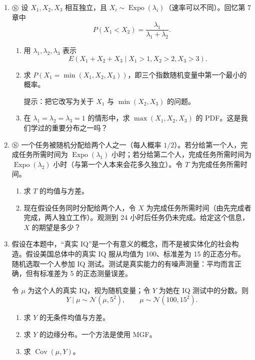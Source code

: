 \documentclass[UTF8, 12pt, fontset=fandol, oneside]{ctexart}
\begin{document}
\begin{enumerate}
  \item $\circledS$ 设 $X_1,X_2,X_3$ 相互独立，且 $X_i\sim\operatorname{Expo}(\lambda_i)$（速率可以不同）。回忆第 7 章中
  \[
    P(X_1<X_2)=\frac{\lambda_1}{\lambda_1+\lambda_2}.
  \]
  \begin{enumerate}
    \item[(a)] 用 $\lambda_1,\lambda_2,\lambda_3$ 表示
    \[
      E(X_1+X_2+X_3\mid X_1>1,X_2>2,X_3>3).
    \]
    \item[(b)] 求 $P(X_1=\min(X_1,X_2,X_3))$，即三个指数随机变量中第一个最小的概率。

    \noindent 提示：把它改写为关于 $X_1$ 与 $\min(X_2,X_3)$ 的问题。

    \item[(c)] 在 $\lambda_1=\lambda_2=\lambda_3=1$ 的情形中，求 $\max(X_1,X_2,X_3)$ 的 PDF。这是我们学过的重要分布之一吗？
  \end{enumerate}

  \item $\circledS$ 一个任务被随机分配给两个人之一（每人概率 $1/2$）。若分给第一个人，完成任务所需时间为 $\operatorname{Expo}(\lambda_1)$ 小时；若分给第二个人，完成任务所需时间为 $\operatorname{Expo}(\lambda_2)$ 小时（与第一个人本来会花多久独立）。令 $T$ 为完成任务所需时间。
  \begin{enumerate}
    \item[(a)] 求 $T$ 的均值与方差。
    \item[(b)] 现在假设任务同时分配给两个人，令 $X$ 为完成任务所需时间（由先完成者完成，两人独立工作）。观测到 24 小时后任务仍未完成。给定这个信息，$X$ 的期望是多少？
  \end{enumerate}

  \item 假设在本题中，“真实 IQ”是一个有意义的概念，而不是被实体化的社会构造。假设美国总体中的真实 IQ 服从均值为 100、标准差为 15 的正态分布。随机选取一个人参加 IQ 测试。测试是真实能力的有噪声测量：平均而言正确，但有标准差为 5 的正态测量误差。

  令 $\mu$ 为这个人的真实 IQ，视为随机变量；令 $Y$ 为她在 IQ 测试中的分数。则
  \[
    Y\mid\mu\sim\mathcal N(\mu,5^2),\qquad
    \mu\sim\mathcal N(100,15^2).
  \]
  \begin{enumerate}
    \item[(a)] 求 $Y$ 的无条件均值与方差。
    \item[(b)] 求 $Y$ 的边缘分布。一个方法是使用 MGF。
    \item[(c)] 求 $\operatorname{Cov}(\mu,Y)$。
  \end{enumerate}


\end{enumerate}
\end{document}
